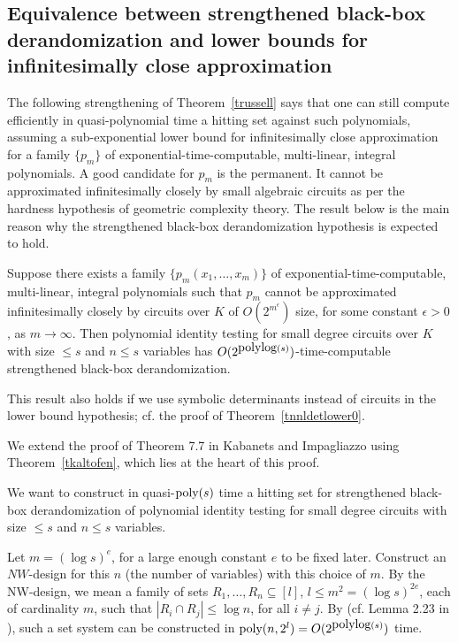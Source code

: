 \documentclass[11pt]{article}
\begin{document}
\subsection{Equivalence between strengthened black-box derandomization and  lower bounds for infinitesimally close approximation}
\label{sequivalencestrong}
The following strengthening  of Theorem~\ref{trussell} 
says that one can still compute efficiently in quasi-polynomial time a hitting set against such polynomials,
assuming a sub-exponential lower bound for infinitesimally close approximation for 
a family $\{p_m\}$ of  exponential-time-computable, multi-linear, 
integral polynomials.
A good candidate for $p_m$  is the permanent. It cannot be approximated infinitesimally closely by small 
algebraic  circuits as per the hardness hypothesis  \cite{GCT1}
of geometric complexity theory.
The result below   is the main reason
why the strengthened black-box derandomization hypothesis  is  expected to hold. 

\begin{theorem} \label{trussell2}
Suppose there exists  a family $\{p_m(x_1,\ldots,x_m)\}$ 
of  exponential-time-computable,  multi-linear, integral
polynomials such   that $p_m$ 
cannot be approximated infinitesimally closely  by   circuits  over $K$ of  
$O(2^{m^\epsilon})$ size, for some   
constant $\epsilon >0$, as $m\rightarrow \infty$.  Then polynomial identity testing for small degree 
circuits  over $K$ 
with size $\le s$ and $n \le s$ variables  has $O(2^{{\mbox {polylog}}(s)})$-time-computable strengthened black-box derandomization. 
\end{theorem}

This result also holds if we use symbolic determinants instead of  circuits in the lower bound hypothesis;
cf.  the proof of Theorem~\ref{tnnldetlower0}.



\proof We extend  the proof  of Theorem 7.7 in Kabanets and Impagliazzo \cite{russell}
 using Theorem~\ref{tkaltofen}, 
which lies at the heart of this proof.

We want to  construct in quasi-${\mbox {poly}}(s)$ time a hitting set 
for strengthened black-box derandomization of polynomial identity testing  for small degree 
circuits  with size $\le s$ and $n \le s$ variables.

Let  $m=(\log s)^e$, for a large enough constant $e$ to be fixed later.
Construct an $NW$-design \cite{nisan} for this $n$ (the number of variables) with this choice of  $m$. 
By the NW-design, we mean a family of sets $R_1,\ldots,R_n \subseteq [l]$,
$l \le m^2=(\log s)^{2 e}$, each of cardinality $m$, such that $|R_i \cap R_j| \le \log n$, for all $i\not = j$.
By \cite{nisan} (cf. Lemma 2.23 in \cite{russell}),
such a set system can be constructed in ${\mbox {poly}}(n, 2^l)=O(2^{{\mbox {polylog}}(s)})$ time.
\end{document}
